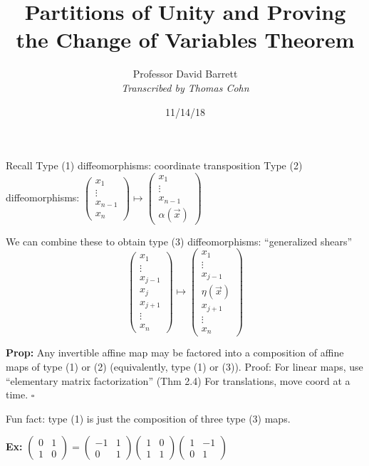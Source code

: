 \documentclass[10pt,letterpaper]{article}
\author{Professor David Barrett\\ \small\textit{Transcribed by Thomas Cohn}}
\title{Partitions of Unity and Proving the Change of Variables Theorem}
\date{11/14/18} %
\newcommand{\n}{\hfill\break}
\newcommand{\prop}[1]{\par\noindent\settowidth{\hangindent}{\textbf{Prop: }}\textbf{Prop: }#1\n}
\newcommand{\ex}[1]{\par\noindent\settowidth{\hangindent}{\textbf{Ex: }}\textbf{Ex: }#1\n}
\newcommand{\proven}{\;$\square$\n}
\newcommand{\paren}[1]{\left(#1\right)}
\begin{document}
\maketitle
\setlength\RaggedRightParindent{\parindent}
\RaggedRight

\par\noindent Recall\n
Type (1) diffeomorphisms: coordinate transposition\n
Type (2) diffeomorphisms: $\paren{\begin{array}{c}x_{1}\\ \vdots\\ x_{n-1}\\ x_{n}\end{array}}\mapsto\paren{\begin{array}{c}x_{1}\\ \vdots\\ x_{n-1}\\ \alpha(\vec{x})\end{array}}$\n

\par\noindent We can combine these to obtain type (3) diffeomorphisms: ``generalized shears''
\[
\paren{\begin{array}{c}x_{1}\\ \vdots\\ x_{j-1}\\ x_{j}\\ x_{j+1}\\ \vdots\\ x_{n}\end{array}}\mapsto\paren{\begin{array}{c}x_{1}\\ \vdots\\ x_{j-1}\\ \eta(\vec{x})\\ x_{j+1}\\ \vdots\\ x_{n}\end{array}}
\]

\prop{Any invertible affine map may be factored into a composition of affine maps of type (1) or (2) (equivalently, type (1) or (3)).\n
Proof: For linear maps, use ``elementary matrix factorization'' (Thm 2.4)\n
For translations, move coord at a time.\n
\proven}

\par\noindent Fun fact: type (1) is just the composition of three type (3) maps.\n

\ex{$\paren{\begin{array}{cc}0 & 1\\ 1 & 0\end{array}}=\paren{\begin{array}{cc}-1 & 1\\ 0 & 1\end{array}}\paren{\begin{array}{cc}1 & 0\\ 1 & 1\end{array}}\paren{\begin{array}{cc}1 & -1\\ 0 & 1\end{array}}$}
\end{document}
